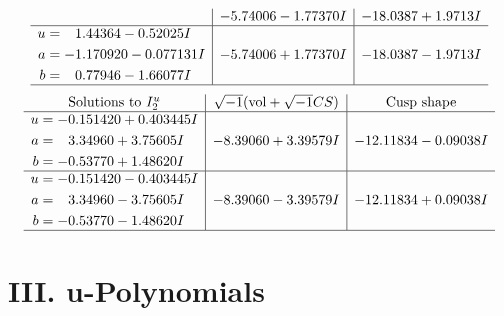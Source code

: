 \documentclass[1p]{elsarticle_modified}
\theoremstyle{definition}
\newcommand{\I}{\sqrt{-1}}
\begin{document}
$$\begin{array}{c|c|c}
 & -5.74006 - 1.77370 I & -18.0387 + 1.9713 I \\ \hline\begin{aligned}
u &= \phantom{-}1.44364 - 0.52025 I \\
a &= -1.170920 - 0.077131 I \\
b &= \phantom{-}0.77946 - 1.66077 I\end{aligned}
 & -5.74006 + 1.77370 I & -18.0387 - 1.9713 I\\
 \hline 
 \end{array}$$\newpage$$\begin{array}{c|c|c}  
\text{Solutions to }I^u_{2}& \I (\text{vol} + \sqrt{-1}CS) & \text{Cusp shape}\\
 \hline 
\begin{aligned}
u &= -0.151420 + 0.403445 I \\
a &= \phantom{-}3.34960 + 3.75605 I \\
b &= -0.53770 + 1.48620 I\end{aligned}
 & -8.39060 + 3.39579 I & -12.11834 - 0.09038 I \\ \hline\begin{aligned}
u &= -0.151420 - 0.403445 I \\
a &= \phantom{-}3.34960 - 3.75605 I \\
b &= -0.53770 - 1.48620 I\end{aligned}
 & -8.39060 - 3.39579 I & -12.11834 + 0.09038 I\\
 \hline 
 \end{array}$$\newpage
\newpage\renewcommand{\arraystretch}{1}
\centering \section*{ III. u-Polynomials}
\end{document}
